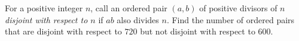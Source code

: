 For a positive integer $n$, call an ordered pair $(a,b)$ of positive divisors of $n$ \emph{disjoint with respect to $n$} if $ab$ also divides $n$. Find the number of ordered pairs that are disjoint with respect to $720$ but not disjoint with respect to $600$.

